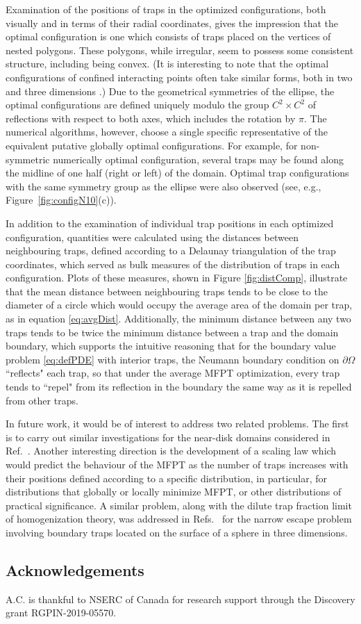 \documentclass[11pt,letter,subeqn,fleqn]{article}
\begin{document}
Examination of the positions of traps in the optimized configurations, both visually and in terms of their radial coordinates, gives the impression that the optimal configuration is one which consists of traps placed on the vertices of nested polygons. These polygons, while irregular, seem to possess some consistent structure, including being convex. (It is interesting to note that the optimal configurations of confined interacting points often take similar forms, both in two and three dimensions \cite{sloane1995minimal, manoharan2003dense, saint2001macroscopic, hoare1971physical}.) Due to the geometrical symmetries of the ellipse, the optimal configurations are defined uniquely modulo the group $C^2\times C^2$ of reflections with respect to both axes, which includes the rotation by $\pi$. The numerical algorithms, however, choose a single specific representative of the equivalent putative globally optimal configurations. For example, for non-symmetric numerically optimal configuration, several traps may be found along the midline of one half (right or left) of the domain. Optimal trap configurations with the same symmetry group as the ellipse were also observed (see, e.g., Figure~\ref{fig:configN10}(c)).


In addition to the examination of individual trap positions in each optimized configuration, quantities were calculated using the distances between neighbouring traps, defined according to a Delaunay triangulation of the trap coordinates, which served as bulk measures of the distribution of traps in each configuration. Plots of these measures, shown in Figure \ref{fig:distComp}, illustrate that the mean distance between neighbouring traps tends to be close to the diameter of a circle which would occupy the average area of the domain per trap, as in equation \eqref{eq:avgDist}. Additionally, the minimum distance between any two traps tends to be twice the minimum distance between a trap and the domain boundary, which supports the intuitive reasoning that for the boundary value problem \eqref{eq:defPDE} with interior traps, the Neumann boundary condition on $\partial\Omega$ ``reflects" each trap, so that under the average MFPT optimization, every trap tends to ``repel" from its reflection in the boundary the same way as it is repelled from other traps.

In future work, it would be of interest to address two related problems. The first is to carry out similar investigations for the near-disk domains considered in Ref.~\cite{iyaniwura2020optimization}. Another interesting direction is the development of a scaling law which would predict the behaviour of the MFPT as the number of traps increases with their positions defined according to a specific distribution, in particular, for distributions that globally or locally minimize MFPT, or other distributions of practical significance. A similar problem, along with the dilute trap fraction limit of homogenization theory, was addressed in Refs.~\cite{cheviakov2010asymptotic, cheviakov2013narrow} for the narrow escape problem involving boundary traps located on the surface of a sphere in three dimensions.

\subsection*{Acknowledgements}
A.C. is thankful to NSERC of Canada for research support through the Discovery grant RGPIN-2019-05570.




\end{document}

